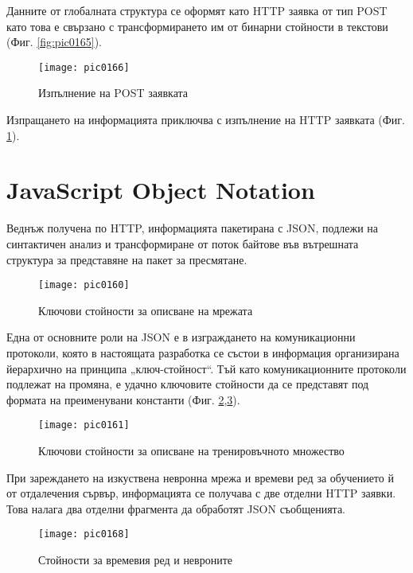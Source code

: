 Данните от глобалната структура се оформят като HTTP заявка от тип POST  като това е свързано с трансформирането им от бинарни стойности в текстови (Фиг. \ref{fig:pic0165}).

\begin{figure}[h]
  \centering
  \texttt{[image: pic0166]}
  \caption{Изпълнение на POST заявката}
\label{fig:pic0166}
\end{figure}
\FloatBarrier

Изпращането на информацията приключва с изпълнение на HTTP заявката (Фиг. \ref{fig:pic0166}).

\section{JavaScript Object Notation}

Веднъж получена по HTTP, информацията пакетирана с JSON, подлежи на синтактичен анализ и трансформиране от поток байтове във вътрешната структура за представяне на пакет за пресмятане. 

\begin{figure}[h]
  \centering
  \texttt{[image: pic0160]}
  \caption{Ключови стойности за описване на мрежата}
\label{fig:pic0160}
\end{figure}
\FloatBarrier

Една от основните роли на JSON е в изграждането на комуникационни протоколи, която в настоящата разработка се състои в информация организирана йерархично на принципа „ключ-стойност“. Тъй като комуникационните протоколи подлежат на промяна, е удачно ключовите стойности да се представят под формата на преименувани константи (Фиг. \ref{fig:pic0160},\ref{fig:pic0161}).

\begin{figure}[h]
  \centering
  \texttt{[image: pic0161]}
  \caption{Ключови стойности за описване на тренировъчното множество}
\label{fig:pic0161}
\end{figure}
\FloatBarrier

При зареждането на изкуствена невронна мрежа и времеви ред за обучението й от отдалечения сървър, информацията се получава с две отделни HTTP заявки. Това налага два отделни фрагмента да обработят JSON съобщенията. 

\begin{figure}[h]
  \centering
  \texttt{[image: pic0168]}
  \caption{Стойности за времевия ред и невроните}
\label{fig:pic0168}
\end{figure}
\FloatBarrier

